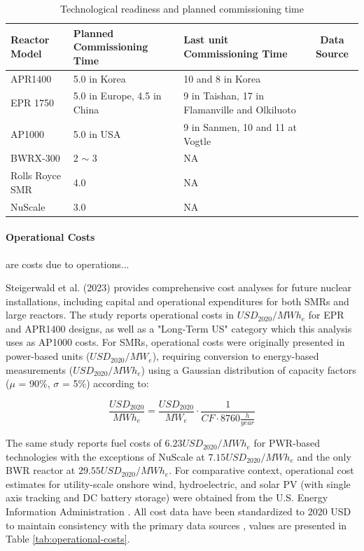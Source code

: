 \begin{table}[!hb]
    \centering
    \begin{tabularx}{\textwidth}{l X X c}
        \toprule
        \textbf{Reactor Model} & \textbf{Planned Commissioning Time} & \textbf{Last unit Commissioning Time} & Data Source\\
        \midrule
        APR1400         & 5.0 in Korea & 10 and 8 in Korea & \cite{nea2020unlocking} \\
        EPR 1750        & 5.0 in Europe, 4.5 in China & 9 in Taishan, 17 in Flamanville and Olkiluoto & \cite{nea2020unlocking} \\
        AP1000          & 5.0 in USA & 9 in Sanmen, 10 and 11 at Vogtle & \cite{nea2020unlocking} \\
        BWRX-300        & 2 $\sim$ 3 & NA & \cite{GEVernova_Nuclear_2025} \\
        Rolls Royce SMR & 4.0 & NA & \cite{RollsRoyce_SMR_Approach_2025} \\
        NuScale         & 3.0 & NA & \cite{NuScale_Power_Module_2025} \\
        \bottomrule
    \end{tabularx}
    \caption{Technological readiness and planned commissioning time}
    \label{tab:tech-readiness}
\end{table}


\paragraph{Operational Costs} are costs due to operations...

Steigerwald et al. (2023) \cite{STEIGERWALD2023128204} provides comprehensive cost analyses for future nuclear installations, including capital and operational expenditures for both SMRs and large reactors. The study reports operational costs in $USD_{2020}/MWh_e$ for EPR and APR1400 designs, as well as a "Long-Term US" category which this analysis uses as AP1000 costs. For SMRs, operational costs were originally presented in power-based units ($USD_{2020}/MW_e$), requiring conversion to energy-based measurements ($USD_{2020}/MWh_e$) using a Gaussian distribution of capacity factors ($\mu$ = 90\%, $\sigma$ = 5\%) according to:

$$
\frac{USD_{2020}}{MWh_e} = \frac{USD_{2020}}{MW_e} \cdot \frac{1}{CF \cdot 8760 \frac{h}{year}}
$$

The same study reports fuel costs of $6.23 USD_{2020}/MWh_e$ for PWR-based technologies with the exceptions of NuScale at $7.15 USD_{2020}/MWh_e$ and the only BWR reactor at $29.55 USD_{2020}/MWh_e$. For comparative context, operational cost estimates for utility-scale onshore wind, hydroelectric, and solar PV (with single axis tracking and DC battery storage) were obtained from the U.S. Energy Information Administration \cite{EIA_Capital_Costs_AEO2024}. All cost data have been standardized to 2020 USD to maintain consistency with the primary data sources \cite{STEIGERWALD2023128204, NEA2020}, values are presented in Table \ref{tab:operational-costs}.


